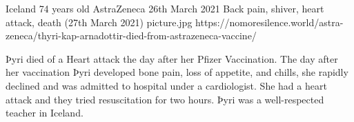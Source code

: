 {Iceland}
{74 years old}
{AstraZeneca}
{26th March 2021}
{Back pain, shiver, heart attack, death (27th March 2021)}
{picture.jpg}
{https://nomoresilence.world/astra-zeneca/thyri-kap-arnadottir-died-from-astrazeneca-vaccine/}
{

Þyri died of a Heart attack the day after her Pfizer Vaccination.  The day after
her vaccination Þyri developed bone pain, loss of appetite, and chills, she
rapidly declined and was admitted to hospital under a cardiologist.  She had a
heart attack and they tried resuscitation for two hours.  Þyri was a
well-respected teacher in Iceland.

}
